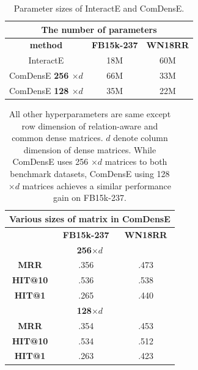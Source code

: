 \begin{table}
\centering
\caption{Parameter sizes of InteractE and ComDensE.}
\label{table3}
\begin{tabular}{c|c|c}
\hline
\multicolumn{3}{c}{\textbf{The number of parameters}}\\
\hline
 \textbf{method} & \textbf{FB15k-237} & \textbf{WN18RR}\\
 \hline
 InteractE & 18M & 60M \\
  \hline
 ComDensE \textbf{256 $\times d$} & 66M & 33M \\
\hline
 ComDensE \textbf{128 $\times d$} & 35M & 22M \\
\hline
\end{tabular}
\end{table}

\begin{table}
\centering
\caption{All other hyperparameters are same except row dimension of relation-aware and common dense matrices. $d$ denote column dimension of dense matrices. While ComDensE uses 256 $\times d$ matrices to both benchmark datasets, ComDensE using 128 $\times d$ matrices achieves a similar performance gain on FB15k-237.
}
\label{table4}
\begin{tabular}{c|c|c}
\hline
\multicolumn{3}{c}{\textbf{Various sizes of matrix in ComDensE}}\\
\hline
 & \textbf{FB15k-237} & \textbf{WN18RR}\\
 \hline
 \multicolumn{3}{c}{\textbf{256$\times d$}}\\
 \textbf{MRR} & .356 & .473 \\
 \textbf{HIT@10} & .536 & .538 \\
 \textbf{HIT@1} & .265 & .440\\
  \hline
 \multicolumn{3}{c}{\textbf{128$\times d$}}\\
 \textbf{MRR} & .354 & .453 \\
 \textbf{HIT@10} & .534 & .512 \\
 \textbf{HIT@1} & .263 & .423 \\
\hline
\end{tabular}
\end{table} 

